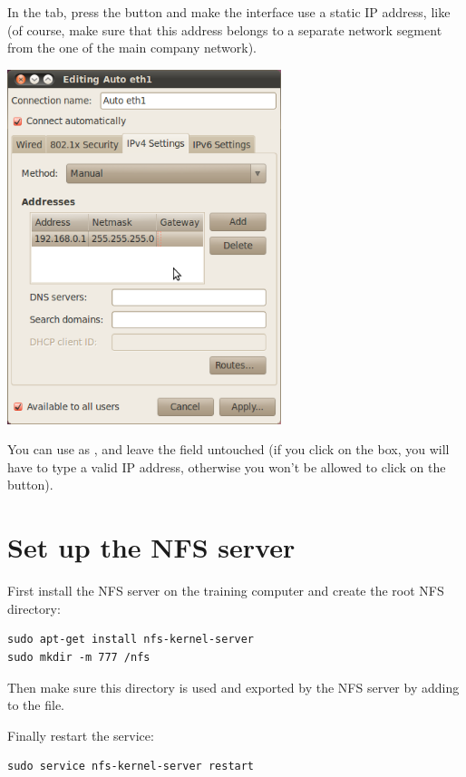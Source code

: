 In the  tab, press the  button
and make the interface use a static IP
address, like  (of course, make sure that this
address belongs to a separate network segment from the one of the main
company network).

\begin{center}
\includegraphics[width=8cm]{../labs/yocto-advanced-configuration/network-config-3.png}
\end{center}

You can use  as , and leave the
 field untouched (if you click on the  box, you
will have to type a valid IP address, otherwise you won't be allowed to
click on the  button).

\section{Set up the NFS server}

First install the NFS server on the training computer and create the root NFS
directory:
\begin{verbatim}
sudo apt-get install nfs-kernel-server
sudo mkdir -m 777 /nfs
\end{verbatim}

Then make sure this directory is used and exported by the NFS server by adding
 to the
 file.

Finally restart the service:
\begin{verbatim}
sudo service nfs-kernel-server restart
\end{verbatim}

